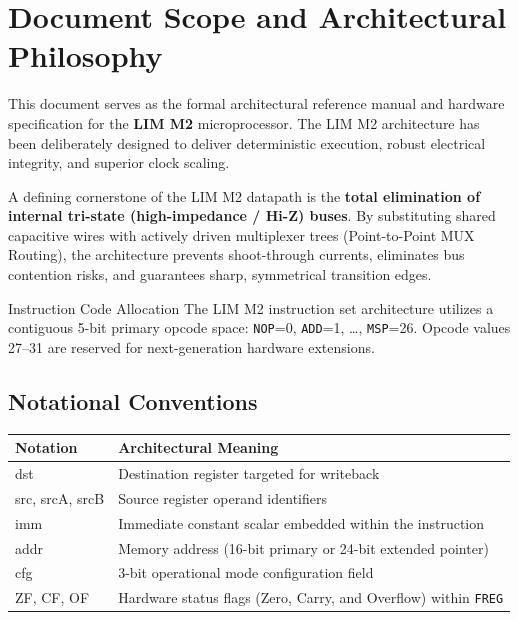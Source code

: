 \documentclass[11pt,a4paper]{article}
\newcommand{\reg}[1]{\texttt{#1}}
\begin{document}
\tableofcontents
\clearpage

\section{Document Scope and Architectural Philosophy}
This document serves as the formal architectural reference manual and hardware specification for the \textbf{LIM M2} microprocessor. The LIM M2 architecture has been deliberately designed to deliver deterministic execution, robust electrical integrity, and superior clock scaling.

A defining cornerstone of the LIM M2 datapath is the \textbf{total elimination of internal tri-state (high-impedance / Hi-Z) buses}. By substituting shared capacitive wires with actively driven multiplexer trees (Point-to-Point MUX Routing), the architecture prevents shoot-through currents, eliminates bus contention risks, and guarantees sharp, symmetrical transition edges.

\begin{limnote}{Instruction Code Allocation}
The LIM M2 instruction set architecture utilizes a contiguous 5-bit primary opcode space:
\texttt{NOP}=0, \texttt{ADD}=1, \ldots, \texttt{MSP}=26. Opcode values 27--31 are reserved for next-generation hardware extensions.
\end{limnote}

\subsection{Notational Conventions}
\begin{tabularx}{\textwidth}{>{\ttfamily}p{28mm}X}
\toprule
Notation & Architectural Meaning \\
\midrule
dst & Destination register targeted for writeback \\
src, srcA, srcB & Source register operand identifiers \\
imm & Immediate constant scalar embedded within the instruction \\
addr & Memory address (16-bit primary or 24-bit extended pointer) \\
cfg & 3-bit operational mode configuration field \\
ZF, CF, OF & Hardware status flags (Zero, Carry, and Overflow) within \reg{FREG} \\
\bottomrule
\end{tabularx}
\end{document}
